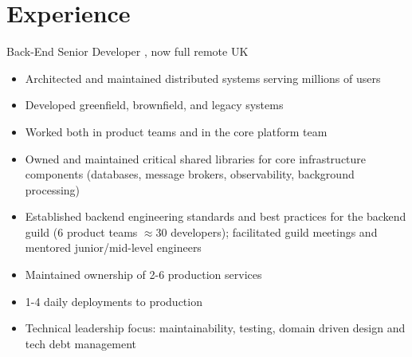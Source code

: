 \documentclass[11pt,a4paper]{moderncv}
\begin{document}


\newpage

\section{Experience}

  {Back-End Senior Developer}
  {\href{https://www.faceit.com/}{\color{link}{Faceit}}, now \href{https://https://eslfaceitgroup.com/}{\color{link}{EFG}}}
  {full remote}
  {UK}
  {
  \begin{itemize}
    \item Architected and maintained distributed systems serving millions of users
    \item Developed greenfield, brownfield, and legacy systems
    \item Worked both in product teams and in the core platform team
    \item Owned and maintained critical shared libraries for core infrastructure components (databases, message brokers, observability, background processing)
    \item Established backend engineering standards and best practices for the backend guild (6 product teams $\approx$30 developers); facilitated guild meetings and mentored junior/mid-level engineers
    \item Maintained ownership of 2-6 production services
    \item 1-4 daily deployments to production
    \item Technical leadership focus: maintainability, testing, domain driven design and tech debt management
  \end{itemize}
}
\end{document}
